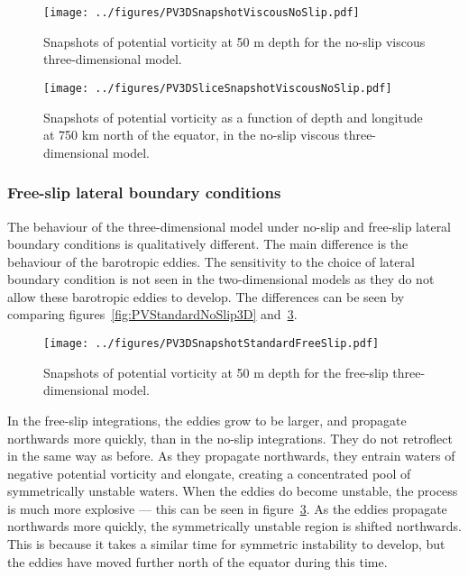 \begin{figure} 
    \centering
    \texttt{[image: ../figures/PV3DSnapshotViscousNoSlip.pdf]}
    \caption{Snapshots of potential vorticity at 50 m depth for the no-slip viscous three-dimensional model.}
    \label{fig:PV3DSnapshotViscousNoSlip}
\end{figure}

\begin{figure} 
    \centering
    \texttt{[image: ../figures/PV3DSliceSnapshotViscousNoSlip.pdf]}
    \caption{Snapshots of potential vorticity as a function of depth and longitude at 750 km north of the equator, in the no-slip viscous three-dimensional model.}
    \label{fig:PVatFixedLatForViscous3D}
\end{figure}

\subsubsection{Free-slip lateral boundary conditions}
The behaviour of the three-dimensional model under no-slip and free-slip lateral boundary conditions is qualitatively different. The main difference is the behaviour of the barotropic eddies. The sensitivity to the choice of lateral boundary condition is not seen in the two-dimensional models as they do not allow these barotropic eddies to develop. The differences can be seen by comparing figures~\ref{fig:PVStandardNoSlip3D} and~\ref{fig:PV3DSnapshotStandardFreeSlip}.

\begin{figure} 
    \centering
    \texttt{[image: ../figures/PV3DSnapshotStandardFreeSlip.pdf]}
    \caption{Snapshots of potential vorticity at 50 m depth for the free-slip three-dimensional model.}
    \label{fig:PV3DSnapshotStandardFreeSlip}
\end{figure}

In the free-slip integrations, the eddies grow to be larger, and propagate northwards more quickly, than in the no-slip integrations. They do not retroflect in the same way as before. As they propagate northwards, they entrain waters of negative potential vorticity and elongate, creating a concentrated pool of symmetrically unstable waters. When the eddies do become unstable, the process is much more explosive --- this can be seen in figure~\ref{fig:PV3DSnapshotStandardFreeSlip}. As the eddies propagate northwards more quickly, the symmetrically unstable region is shifted northwards. This is because it takes a similar time for symmetric instability to develop, but the eddies have moved further north of the equator during this time.

